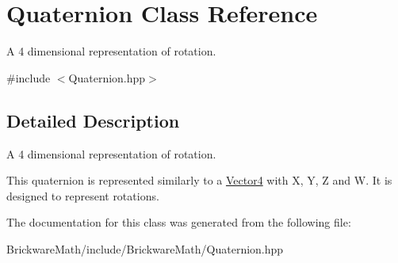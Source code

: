 \hypertarget{classQuaternion}{}\section{Quaternion Class Reference}
\label{classQuaternion}


A 4 dimensional representation of rotation.  




{\ttfamily \#include $<$Quaternion.\+hpp$>$}



\subsection{Detailed Description}
A 4 dimensional representation of rotation. 

This quaternion is represented similarly to a \hyperlink{classVector4}{Vector4} with X, Y, Z and W. It is designed to represent rotations. 

The documentation for this class was generated from the following file\+:\begin{DoxyCompactItemize}
\item 
Brickware\+Math/include/\+Brickware\+Math/Quaternion.\+hpp\end{DoxyCompactItemize}
